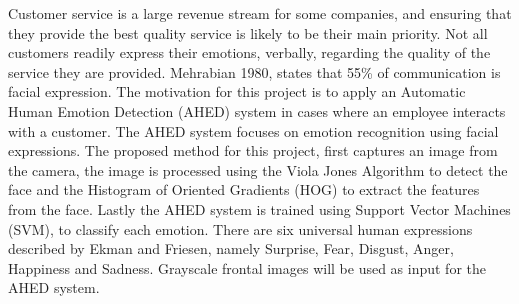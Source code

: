 
Customer service is a large revenue stream for some companies, and ensuring that they provide the best quality service is likely to be their main priority. Not all customers readily express their emotions, verbally, regarding the quality of the service they are provided. Mehrabian 1980, states that 55\% of communication is facial expression. The motivation for this project is to apply an Automatic Human Emotion Detection (AHED) system in cases where an employee interacts with a customer. The AHED system focuses on emotion recognition using facial expressions. The proposed method for this project, first captures an image from the camera, the image is processed using the Viola Jones Algorithm to detect the face and the Histogram of Oriented Gradients (HOG) to extract the features from the face. Lastly the AHED system is trained using Support Vector Machines (SVM), to classify each emotion. There are six universal human expressions described by Ekman and Friesen, namely Surprise, Fear, Disgust, Anger, Happiness and Sadness. Grayscale frontal images will be used as input for the AHED system.
